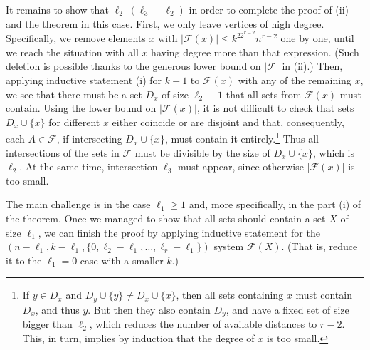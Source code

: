 \documentclass[graybox]{svmult}
\renewcommand{\le}{\leqslant}
\renewcommand{\ge}{\geqslant}
\newcommand{\ff}{\mathcal{F}}
\begin{document}
It remains to show that $\ell_2|(\ell_3-\ell_2)$ in order to complete the proof of (ii) and the theorem in this case. First, we only leave vertices of high degree. Specifically, we remove elements $x$ with $|\ff(x)|\le k^22^{r-2}n^{r-2}$  one by one, until we reach the situation with all $x$ having  degree more than that expression. (Such deletion is possible thanks to the generous lower bound on $|\ff|$ in (ii).) Then, applying inductive statement (i) for $k-1$ to $\ff(x)$ with any of the remaining $x$, we see that there must be a set $D_x$ of size $\ell_2-1$ that all sets from $\ff(x)$ must contain. Using the lower bound on $|\ff(x)|$, it is not difficult to check that sets $D_x\cup \{x\}$ for different $x$ either coincide or are disjoint and that, consequently, each $A\in \ff$, if intersecting $D_x\cup \{x\}$, must contain it entirely.\footnote{If $y\in D_x$ and $D_y\cup \{y\}\ne D_x\cup\{x\}$, then all sets containing $x$ must contain $D_x$, and thus $y$. But then they also contain $D_y$, and have a fixed set of size bigger than $\ell_2$, which reduces the number of available distances to $r-2$. This, in turn, implies by induction that the degree of $x$ is too small.} Thus all intersections of the sets in $\ff$ must be divisible by the size of $D_x\cup \{x\}$, which is $\ell_2$. At the same time, intersection $\ell_3$ must appear, since otherwise $|\ff(x)|$ is too small.

The main challenge is in the case $\ell_1\ge 1$ and, more specifically, in the part (i) of the theorem. Once we managed to show that all sets should contain a  set $X$ of size $\ell_1$, we can finish the proof by applying inductive statement for the $(n-\ell_1,k-\ell_1,\{0,\ell_2-\ell_1,\ldots, \ell_r-\ell_1\})$ system $\ff(X)$. (That is, reduce it to the $\ell_1=0$ case with a smaller $k$.)
\end{document}
